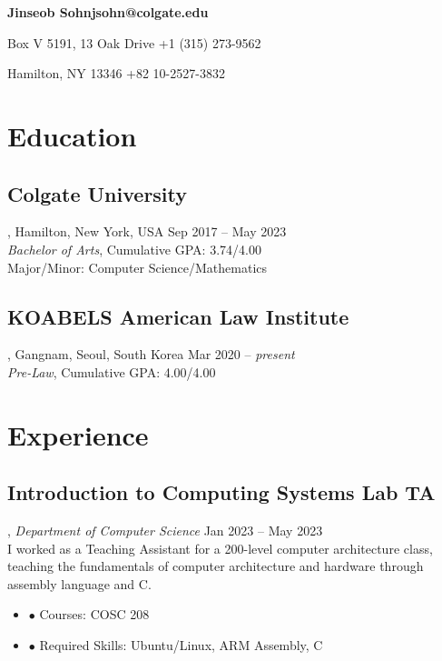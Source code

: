 \documentclass[10pt, letterpaper]{article}
\newenvironment{nitemize}{%
  \begin{itemize}[label={},topsep=0pt,itemsep=0pt,parsep=0pt,leftmargin=*]%
}{%
  \end{itemize}%
}
\begin{document}
\begingroup\centering
\begin{minipage}{\textwidth}
    \textbf{\Large Jinseob Sohn}\hfill\textbf{jsohn@colgate.edu}

        Box V 5191, 13 Oak Drive \hfill +1 (315) 273-9562

        Hamilton, NY 13346 \hfill +82 10-2527-3832
\end{minipage}%
\endgroup
\section{Education}
\subsection{Colgate University}, Hamilton, New York, USA \hfill Sep 2017 – May 2023\\
\emph{Bachelor of Arts}, Cumulative GPA: 3.74/4.00\\
Major/Minor: Computer Science/Mathematics
\subsection{KOABELS American Law Institute}, Gangnam, Seoul, South Korea \hfill Mar 2020 – \emph{present} \\
\emph{Pre-Law}, Cumulative GPA: 4.00/4.00

\section{Experience}
\subsection{Introduction to Computing Systems Lab TA}, \emph{Department of Computer Science} \hfill Jan 2023 – May 2023\\
I worked as a Teaching Assistant for a 200-level computer architecture class, teaching the fundamentals of computer architecture and hardware through assembly language and C.
\begin{nitemize}
    \item \(\bullet\) Courses: COSC 208
    \item \(\bullet\) Required Skills: Ubuntu/Linux, ARM Assembly, C
\end{nitemize}
\end{document}
